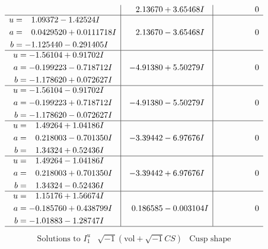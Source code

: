 \documentclass[1p]{elsarticle_modified}
\theoremstyle{definition}
\newcommand{\I}{\sqrt{-1}}
\begin{document}
$$\begin{array}{c|c|c}
 & \phantom{-}2.13670 + 3.65468 I & \phantom{-0.000000 } 0 \\ \hline\begin{aligned}
u &= \phantom{-}1.09372 - 1.42524 I \\
a &= \phantom{-}0.0429520 + 0.0111718 I \\
b &= -1.125440 - 0.291405 I\end{aligned}
 & \phantom{-}2.13670 - 3.65468 I & \phantom{-0.000000 } 0 \\ \hline\begin{aligned}
u &= -1.56104 + 0.91702 I \\
a &= -0.199223 - 0.718712 I \\
b &= -1.178620 + 0.072627 I\end{aligned}
 & -4.91380 + 5.50279 I & \phantom{-0.000000 } 0 \\ \hline\begin{aligned}
u &= -1.56104 - 0.91702 I \\
a &= -0.199223 + 0.718712 I \\
b &= -1.178620 - 0.072627 I\end{aligned}
 & -4.91380 - 5.50279 I & \phantom{-0.000000 } 0 \\ \hline\begin{aligned}
u &= \phantom{-}1.49264 + 1.04186 I \\
a &= \phantom{-}0.218003 - 0.701350 I \\
b &= \phantom{-}1.34324 + 0.52436 I\end{aligned}
 & -3.39442 - 6.97676 I & \phantom{-0.000000 } 0 \\ \hline\begin{aligned}
u &= \phantom{-}1.49264 - 1.04186 I \\
a &= \phantom{-}0.218003 + 0.701350 I \\
b &= \phantom{-}1.34324 - 0.52436 I\end{aligned}
 & -3.39442 + 6.97676 I & \phantom{-0.000000 } 0 \\ \hline\begin{aligned}
u &= \phantom{-}1.15176 + 1.56674 I \\
a &= -0.185760 + 0.438799 I \\
b &= -1.01883 - 1.28747 I\end{aligned}
 & \phantom{-}0.186585 - 0.003104 I & \phantom{-0.000000 } 0\\
 \hline 
 \end{array}$$\newpage$$\begin{array}{c|c|c}  
\text{Solutions to }I^u_{1}& \I (\text{vol} + \sqrt{-1}CS) & \text{Cusp shape}\\

\end{array}$$
\end{document}

